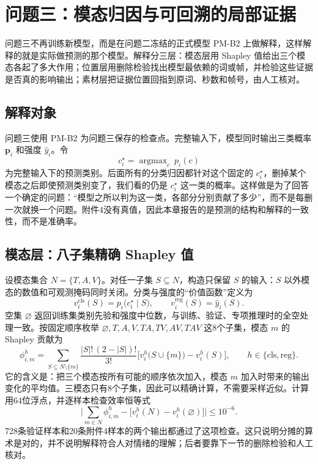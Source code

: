\section{问题三：模态归因与可回溯的局部证据}\label{sec:q3}

问题三不再训练新模型，而是在问题二冻结的正式模型 PM-B2 上做解释，这样解释的就是实际做预测的那个模型。解释分三层：模态层用 Shapley 值给出三个模态各起了多大作用；位置层用删除检验找出模型最依赖的词或帧，并检验这些证据是否真的影响输出；素材层把证据位置回指到原词、秒数和帧号，由人工核对。

\subsection{解释对象}

问题三使用 PM-B2 为问题三保存的检查点。完整输入下，模型同时输出三类概率 $\boldsymbol p_i$ 和强度 $\hat y_i$。令
\begin{equation}\label{eq:target}
c_i^\star=\mathop{\arg\max}_{c}\ p_i(c)
\end{equation}
为完整输入下的预测类别。后面所有的分类归因都针对这个固定的 $c_i^\star$，删掉某个模态之后即使预测类别变了，我们看的仍是 $c_i^\star$ 这一类的概率。这样做是为了回答一个确定的问题：“模型之所以判为这一类，各部分分别贡献了多少”，而不是每删一次就换一个问题。附件4没有真值，因此本章报告的是预测的结构和解释的一致性，而不是准确率。

\subsection{模态层：八子集精确 Shapley 值}\label{sec:shap}

设模态集合 $N=\{T,A,V\}$。对任一子集 $S\subseteq N$，构造只保留 $S$ 的输入：$S$ 以外模态的数值和可观测掩码同时关闭。分类与强度的“价值函数”定义为
\begin{equation}\label{eq:value}
v_i^{\mathrm{cls}}(S)=p_i\big(c_i^\star\mid S\big),\qquad v_i^{\mathrm{reg}}(S)=\hat y_i(S).
\end{equation}
空集 $\varnothing$ 返回训练集类别先验和强度中位数，与训练、验证、专项推理时的全空处理一致。按固定顺序枚举 $\varnothing,T,A,V,TA,TV,AV,TAV$ 这8个子集，模态 $m$ 的 Shapley 贡献为
\begin{equation}\label{eq:shap}
\phi_{i,m}^h=\sum_{S\subseteq N\setminus\{m\}}\frac{|S|!\,(2-|S|)!}{3!}\Big[v_i^h\big(S\cup\{m\}\big)-v_i^h(S)\Big],\qquad h\in\{\mathrm{cls},\mathrm{reg}\}.
\end{equation}
它的含义是：把三个模态按所有可能的顺序依次加入，模态 $m$ 加入时带来的输出变化的平均值\cite{lundberg2017shap}。三模态只有8个子集，因此可以精确计算，不需要采样近似。计算用64位浮点，并逐样本检查效率恒等式
\begin{equation}\label{eq:eff}
\Big|\sum_{m\in N}\phi_{i,m}^h-\big[v_i^h(N)-v_i^h(\varnothing)\big]\Big|\le10^{-6}.
\end{equation}
728条验证样本和20条附件4样本的两个输出都通过了这项检查。这只说明分摊的算术是对的，并不说明解释符合人对情绪的理解；后者要靠下一节的删除检验和人工核对。

